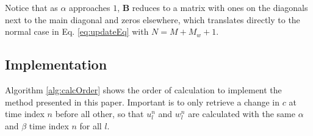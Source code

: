 %
Notice that as $\alpha$ approaches $1$, $\mathbf{B}$ reduces to a matrix with ones on the diagonals next to the main diagonal and zeros elsewhere, which translates directly to the normal case in Eq. \eqref{eq:updateEq} with $N = M + M_w + 1$. 

\subsection{Implementation}
Algorithm \ref{alg:calcOrder} shows the order of calculation to implement the method presented in this paper. Important is to only retrieve a change in $c$ at time index $n$ before all other, so that $u_l^n$ and $w_l^n$ are calculated with the same $\alpha$ and $\beta$ time index $n$ for all $l$.
